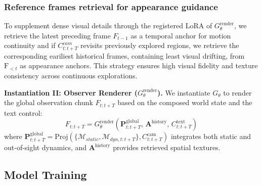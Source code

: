 \vspace{-3mm}
\subsubsection{Reference frames retrieval for appearance guidance}
To supplement dense visual details through the registered LoRA of $G_{\theta}^{\text{render}}$, we retrieve the latest preceding frame $F_{t-1}$ as a temporal anchor for motion continuity and if $C_{t:t+T}^{cam}$ revisits previously explored regions, we retrieve the corresponding eariliest historical frames, containing least visual drifting, from $\text{F}_{<t}$ as appearance anchors. This strategy ensures high visual fidelity and texture consistency across continuous explorations.

\begin{tcolorbox}[width=1.0\linewidth, colframe=blackish, colback=lightgraybg, boxsep=0mm, arc=1mm, left=1mm, right=1mm, top=1mm, bottom=1mm]
\textbf{Instantiation II: Observer Renderer ($G_{\theta}^{\text{render}}$).} We instantiate $G_{\theta}$ to render the global observation chunk $F_{t:t+T}$ based on the composed world state and the text control:
\vspace{-1mm}
\begin{equation}
    F_{t:t+T} = G_{\theta}^{\text{render}}(\mathbf{P}_{t:t+T}^{\text{global}},\, \mathbf{A}^{\text{history}},\, C_{t:t+T}^{\text{text}})
\end{equation}
where $\mathbf{P}_{t:t+T}^{\text{global}} = \text{Proj}(\{\mathcal{M}_{static}, \mathcal{M}_{dyn, t:t+T}\}, C_{t:t+T}^{\text{cam}})$ integrates both static and out-of-sight dynamics, and $\mathbf{A}^{\text{history}}$ provides retrieved spatial textures.
\end{tcolorbox}


\vspace{-3mm}
\subsection{Model Training}
\label{sec:training}

